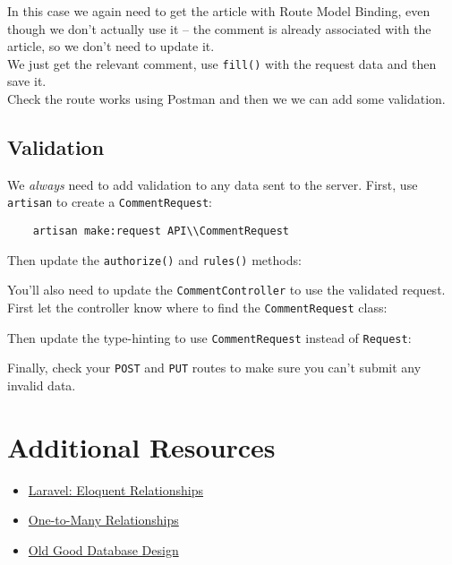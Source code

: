 In this case we again need to get the article with Route Model Binding, even though we don't actually use it – the comment is already associated with the article, so we don't need to update it.
\\

We just get the relevant comment, use \texttt{fill()} with the request data and then save it.
\\

Check the route works using Postman and then we we can add some validation.


\subsection{Validation}

We \textit{always} need to add validation to any data sent to the server. First, use \texttt{artisan} to create a \texttt{CommentRequest}:

\begin{verbatim}
    artisan make:request API\\CommentRequest
\end{verbatim}

Then update the \texttt{authorize()} and \texttt{rules()} methods:


You'll also need to update the \texttt{CommentController} to use the validated request. First let the controller know where to find the \texttt{CommentRequest} class:


Then update the type-hinting to use \texttt{CommentRequest} instead of \texttt{Request}:


Finally, check your \texttt{POST} and \texttt{PUT} routes to make sure you can't submit any invalid data.


\section{Additional Resources}

\begin{itemize}[leftmargin=*]
    \item \href{http://laravel.com/docs/7.x/eloquent-relationships}{Laravel: Eloquent Relationships}
    \item \href{https://mysql.programmingpedia.net/en/tutorial/9600/one-to-many}{One-to-Many Relationships}
    \item \href{https://relinx.io/2020/09/14/old-good-database-design}{Old Good Database Design}
\end{itemize}
